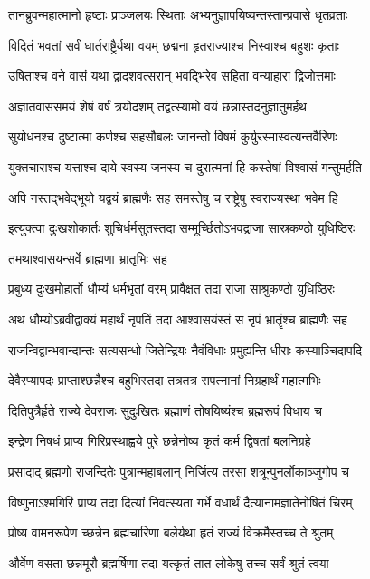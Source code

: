 \twolineshloka
{तानब्रुवन्महात्मानो हृष्टाः प्राञ्जलयः स्थिताः}
{अभ्यनुज्ञापयिष्यन्तस्तान्प्रवासे धृतव्रताः}


\twolineshloka
{विदितं भवतां सर्वं धार्तराष्ट्रैर्यथा वयम्}
{छद्मना हृतराज्याश्च निस्वाश्च बहुशः कृताः}


\twolineshloka
{उषिताश्च वने वासं यथा द्वादशवत्सरान्}
{भवद्भिरेव सहिता वन्याहारा द्विजोत्तमाः}


\twolineshloka
{अज्ञातवाससमयं शेषं वर्षं त्रयोदशम्}
{तद्वत्स्यामो वयं छन्नास्तदनुज्ञातुमर्हथ}


\twolineshloka
{सुयोधनश्च दुष्टात्मा कर्णश्च सहसौबलः}
{जानन्तो विषमं कुर्युरस्मास्वत्यन्तवैरिणः}


\twolineshloka
{युक्तचाराश्च यत्ताश्च दाये स्वस्य जनस्य च}
{दुरात्मनां हि कस्तेषां विश्वासं गन्तुमर्हति}


\twolineshloka
{अपि नस्तद्भवेद्भूयो यद्वयं ब्राह्मणैः सह}
{समस्तेषु च राष्ट्रेषु स्वराज्यस्था भवेम हि}


\twolineshloka
{इत्युक्त्वा दुःखशोकार्तः शुचिर्धर्मसुतस्तदा}
{सम्मूर्च्छितोऽभवद्राजा सास्रकण्ठो युधिष्ठिरः}


\onelineshloka
{तमथाश्वासयन्सर्वे ब्राह्मणा भ्रातृभिः सह}

\twolineshloka
{प्रबुध्य दुःखमोहार्तो धौम्यं धर्मभृतां वरम्}
{प्रावैक्षत तदा राजा साश्रुकण्ठो युधिष्ठिरः}


\twolineshloka
{अथ धौम्योऽब्रवीद्वाक्यं महार्थं नृपतिं तदा}
{आश्वासयंस्तं स नृपं भ्रातॄंश्च ब्राह्मणैः सह}


\twolineshloka
{राजन्विद्वान्भवान्दान्तः सत्यसन्धो जितेन्द्रियः}
{नैवंविधाः प्रमुह्यन्ति धीराः कस्याञ्चिदापदि}


\twolineshloka
{देवैरप्यापदः प्राप्ताश्छन्नैश्च बहुभिस्तदा}
{तत्रतत्र सपत्नानां निग्रहार्थं महात्मभिः}


\twolineshloka
{दितिपुत्रैर्हृते राज्ये देवराजः सुदुःखितः}
{ब्रह्माणं तोषयिष्यंश्च ब्रह्मरूपं विधाय च}


\twolineshloka
{इन्द्रेण निषधं प्राप्य गिरिप्रस्थाह्वये पुरे}
{छन्नेनोष्य कृतं कर्म द्विषतां बलनिग्रहे}


\twolineshloka
{प्रसादाद् ब्रह्मणो राजन्दितेः पुत्रान्महाबलान्}
{निर्जित्य तरसा शत्रून्पुनर्लोकाञ्जुगोप च}


\twolineshloka
{विष्णुनाऽश्मगिरिं प्राप्य तदा दित्यां निवत्स्यता}
{गर्भे वधार्थं दैत्यानामज्ञातेनोषितं चिरम्}


\twolineshloka
{प्रोष्य वामनरूपेण च्छन्नेन ब्रह्मचारिणा}
{बलेर्यथा हृतं राज्यं विक्रमैस्तच्च ते श्रुतम्}


\twolineshloka
{और्वेण वसता छन्नमूरौ ब्रह्मर्षिणा तदा}
{यत्कृतं तात लोकेषु तच्च सर्वं श्रुतं त्वया}


